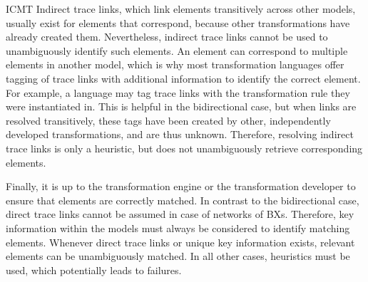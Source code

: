 \begin{copiedFrom}{ICMT}
Indirect trace links, which link elements transitively across other models, usually exist for elements that correspond, because other transformations have already created them.
Nevertheless, indirect trace links cannot be used to unambiguously identify such elements.
An element can correspond to multiple elements in another model, which is why most transformation languages offer tagging of trace links with additional information to identify the correct element.
For example, a language may tag trace links with the transformation rule they were instantiated in.
This is helpful in the bidirectional case, but when links are resolved transitively, these tags have been created by other, independently developed transformations, and are thus unknown.
Therefore, resolving indirect trace links is only a heuristic, but does not unambiguously retrieve corresponding elements.



Finally, it is up to the transformation engine or the transformation developer %
to ensure that elements are correctly matched.
In contrast to the bidirectional case, direct trace links cannot be assumed in case of networks of \acp{BX}.
Therefore, key information within the models must always be considered to identify matching elements.
Whenever direct trace links or unique key information exists, relevant elements can be unambiguously matched.
In all other cases, heuristics must be used, which potentially leads to failures.

\end{copiedFrom} %


